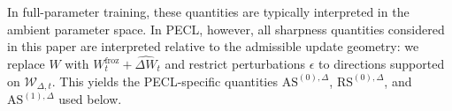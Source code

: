 \documentclass[10pt]{article} %
\begin{document}
In full-parameter training, these quantities are typically interpreted in the ambient parameter space.
In PECL, however, all sharpness quantities considered in this paper are interpreted relative to the admissible update geometry: we replace $W$ with $W_t^{\mathrm{froz}}+\widehat{\Delta W}_t$ and restrict perturbations $\epsilon$ to directions supported on $\mathcal{W}_{\Delta,t}$.
This yields the PECL-specific quantities $\mathrm{AS}^{(0),\Delta}$, $\mathrm{RS}^{(0),\Delta}$, and $\mathrm{AS}^{(1),\Delta}$ used below.





\end{document}
